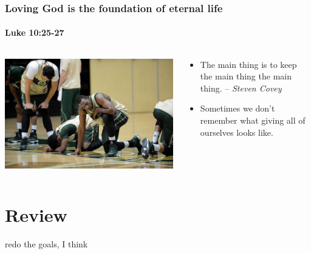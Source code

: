 \begin{frame}
	\frametitle{Loving God is the foundation of eternal life}
	\framesubtitle{Luke 10:25-27}
	\begin{columns}
	\begin{column}{0.5\textwidth}
		\includegraphics[width=\columnwidth]{figures/basketballRunning.jpg}
	\end{column}
	\begin{column}{0.5\textwidth}
		\begin{itemize}
			\item The main thing is to keep the main thing the main thing. -- {\footnotesize \emph{Steven Covey}}
			\item Sometimes we don't remember what giving all of ourselves looks like.
		\end{itemize}
	\end{column}
	\end{columns}
\end{frame}

\section{Review}

\begin{frame}
redo the goals, I think 
\end{frame}